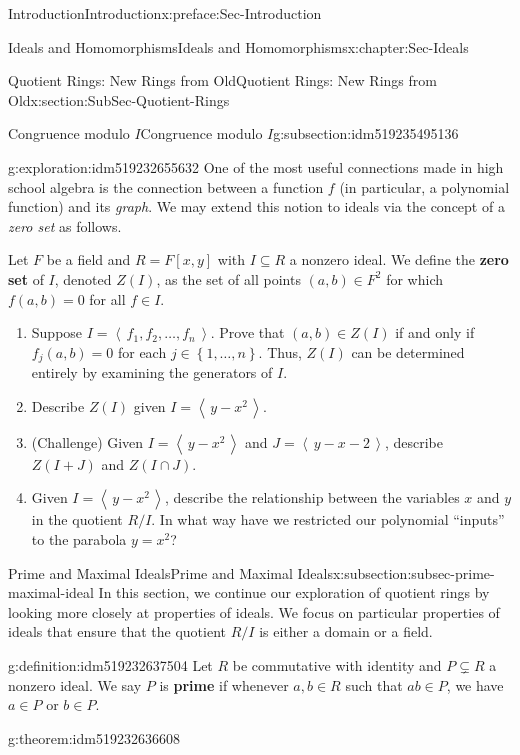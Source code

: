 \documentclass[oneside,10pt,]{book}
\newcommand{\terminology}[1]{\textbf{#1}}
\numberwithin{equation}{section}
\newcommand{\ideal}[1]{\left\langle\, #1 \,\right\rangle}
\newcommand{\set}[1]{\left\{ {#1} \right\}}
\begin{document}
\begin{preface}{Introduction}{}{Introduction}{}{}{x:preface:Sec-Introduction}
\begin{chapterptx}{Ideals and Homomorphisms}{}{Ideals and Homomorphisms}{}{}{x:chapter:Sec-Ideals}
\begin{sectionptx}{Quotient Rings: New Rings from Old}{}{Quotient Rings: New Rings from Old}{}{}{x:section:SubSec-Quotient-Rings}
\begin{subsectionptx}{Congruence modulo \(I\)}{}{Congruence modulo \(I\)}{}{}{g:subsection:idm519235495136}
\begin{exploration}{}{g:exploration:idm519232655632}%
One of the most useful connections made in high school algebra is the connection between a function \(f\) (in particular, a polynomial function) and its \emph{graph}. We may extend this notion to ideals via the concept of a \emph{zero set} as follows.%
\par
Let \(F\) be a field and \(R = F[x,y]\) with \(I\subseteq R\) a nonzero ideal. We define the \terminology{zero set} of \(I\), denoted \(Z(I)\), as the set of all points \((a,b)\in F^2\) for which \(f(a,b)=0\) for all \(f\in I\).%
%
\begin{enumerate}
\item{}Suppose \(I = \ideal{f_1, f_2, \ldots, f_n}\). Prove that \((a,b)\in Z(I)\) if and only if \(f_j(a,b) = 0\) for each \(j\in \set{1,\ldots, n}\). Thus, \(Z(I)\) can be determined entirely by examining the generators of \(I\).%
\item{}Describe \(Z(I)\) given \(I = \ideal{y-x^2}\).%
\item{}(Challenge) Given \(I = \ideal{y-x^2}\) and \(J = \ideal{y-x-2}\), describe \(Z(I+J)\) and \(Z(I\cap J)\).%
\item{}Given \(I=\ideal{y-x^2}\), describe the relationship between the variables \(x\) and \(y\) in the quotient \(R/I\). In what way have we restricted our polynomial ``inputs'' to the parabola \(y = x^2\)?%
\end{enumerate}
\end{exploration}
\end{subsectionptx}
%
%
\typeout{************************************************}
\typeout{************************************************}
%
\begin{subsectionptx}{Prime and Maximal Ideals}{}{Prime and Maximal Ideals}{}{}{x:subsection:subsec-prime-maximal-ideal}
In this section, we continue our exploration of quotient rings by looking more closely at properties of ideals. We focus on particular properties of ideals that ensure that the quotient \(R/I\) is either a domain or a field.%
\begin{definition}{}{g:definition:idm519232637504}%
%
%
Let \(R\) be commutative with identity and \(P\subsetneq R\) a nonzero ideal. We say \(P\) is \terminology{prime} if whenever \(a,b\in R\) such that \(ab\in P\), we have \(a\in P\) or \(b\in P\).%
\end{definition}
\begin{theorem}{}{}{g:theorem:idm519232636608}%

\end{theorem}
\end{subsectionptx}
\end{sectionptx}
\end{chapterptx}
\end{preface}
\end{document}
